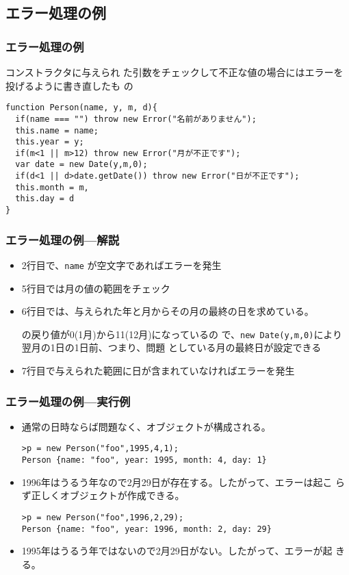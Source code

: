 \documentclass[dvipsk]{beamer}
\begin{document}
\subsection{エラー処理の例}
\begin{frame}[containsverbatim]
 \frametitle{エラー処理の例}
コンストラクタに与えられ
	た引数をチェックして不正な値の場合にはエラーを投げるように書き直したも
 の
 {\small
\begin{verbatim}
function Person(name, y, m, d){
  if(name === "") throw new Error("名前がありません");
  this.name = name;
  this.year = y;
  if(m<1 || m>12) throw new Error("月が不正です");
  var date = new Date(y,m,0);
  if(d<1 || d>date.getDate()) throw new Error("日が不正です");
  this.month = m,
  this.day = d
}
\end{verbatim}
 }
\end{frame}
\begin{frame}[containsverbatim]
 \frametitle{エラー処理の例---解説}
\begin{itemize}
 \item 2行目で、\texttt{name} が空文字であればエラーを発生
 \item 5行目では月の値の範囲をチェック
 \item 6行目では、与えられた年と月からその月の最終の日を求めている。
       
			 の戻り値が0(1月)から11(12月)になっているの
			 で、\texttt{new Date(y,m,0)}により翌月の1日の1日前、つまり、問題
			 としている月の最終日が設定できる
 \item 7行目で与えられた範囲に日が含まれていなければエラーを発生
\end{itemize}
 \end{frame}
\begin{frame}[containsverbatim]
 \frametitle{エラー処理の例---実行例}
\begin{itemize}
 \item 通常の日時ならば問題なく、オブジェクトが構成される。
\begin{verbatim}
>p = new Person("foo",1995,4,1);
Person {name: "foo", year: 1995, month: 4, day: 1}
\end{verbatim}
 \item 1996年はうるう年なので2月29日が存在する。したがって、エラーは起こ
			 らず正しくオブジェクトが作成できる。
\begin{verbatim}
>p = new Person("foo",1996,2,29);
Person {name: "foo", year: 1996, month: 2, day: 29}
\end{verbatim}
 \item 1995年はうるう年ではないので2月29日がない。したがって、エラーが起
			 きる。
\end{itemize}
 \end{frame}
\end{document}
